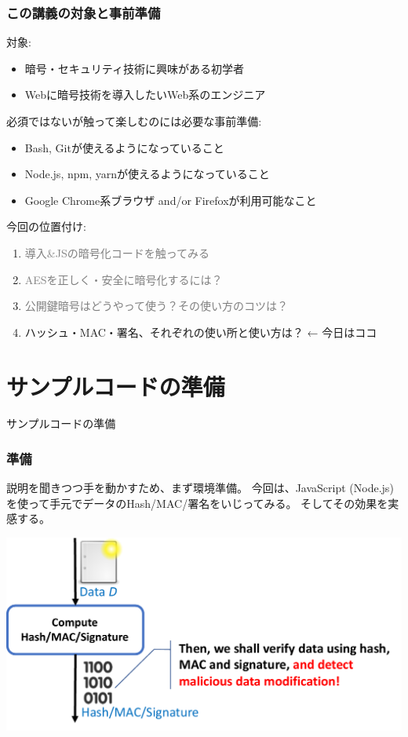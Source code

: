 \documentclass[12pt,dvipdfmx]{beamer}
\begin{document}
\begin{frame}
\frametitle{この講義の対象と事前準備}
対象:
\begin{itemize}
\item 暗号・セキュリティ技術に興味がある初学者
\item Webに暗号技術を導入したいWeb系のエンジニア
\end{itemize}

\vspace{2ex}

必須ではないが触って楽しむのには必要な事前準備:
\begin{itemize}
\item Bash, Gitが使えるようになっていること
\item Node.js, npm, yarnが使えるようになっていること
\item Google Chrome系ブラウザ and/or Firefoxが利用可能なこと
\end{itemize}
\end{frame}

\begin{frame}
今回の位置付け:
\begin{enumerate}
 \item \textcolor{gray}{導入\&JSの暗号化コードを触ってみる}
 \item \textcolor{gray}{AESを正しく・安全に暗号化するには？}
 \item \textcolor{gray}{公開鍵暗号はどうやって使う？その使い方のコツは？}
 \item \alert{ハッシュ・MAC・署名、それぞれの使い所と使い方は？} ← 今日はココ
\end{enumerate}

\end{frame}

\section{サンプルコードの準備}
\begin{frame}
\centering
{\Large サンプルコードの準備}
\end{frame}

\begin{frame}
\frametitle{準備}
\small
説明を聞きつつ手を動かすため、まず環境準備。
\alert{今回は、JavaScript (Node.js) を使って手元でデータのHash/MAC/署名をいじってみる。}
そしてその効果を実感する。

\begin{center}
\includegraphics[width=0.7\linewidth]{Figs/md-flow.pdf}
\end{center}

\end{frame}
\end{document}
